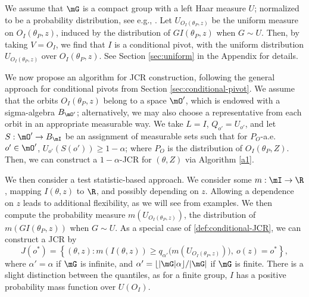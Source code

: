 \documentclass[english]{article}
\begin{document}
We assume that $\mG$ is a compact group with a left Haar measure $U$; normalized to be a probability distribution, see e.g., \cite{eaton1989group,wijsman1990invariant}. 
Let $U_{O_I(\theta_P,z)}$ be the uniform measure on $O_I(\theta_P,z)$, induced by the distribution of $GI(\theta_P,z)$ when $G\sim U$.
Then, by taking $V = O_I$, we find that $I$ is a conditional pivot, with the uniform distribution $U_{O_I(\theta_P,z)}$ over $O_I(\theta_P,z)$. See Section \ref{sec:uniform} in the Appendix for details.

  
We now propose an algorithm for JCR construction, following the general approach for conditional pivots from Section \ref{sec:conditional-pivot}. 
We assume that the orbits $O_I(\theta_P,z)$ 
belong to a space $\mO'$, which is endowed with a sigma-algebra $B_{\mO'}$; alternatively, we may also choose a representative from each orbit in an appropriate measurable way.
We take $L = I$, $Q_{o'} = U_{o'}$,
and let $S: \mO' \to B_{\mI}$ be an assignment of measurable sets such that for $P_O$-a.e. $o' \in \mO'$,  $U_{o'}(S(o'))\ge 1-\alpha$;
where $P_O$ is the distribution of $O_I(\theta_P,Z)$.
Then, we can 
 construct a  $1-\alpha$-JCR for $(\theta,Z)$ via Algorithm \ref{a1}.
 
We then consider a test statistic-based approach.
We consider some $m: \mI\to \R$, mapping $I(\theta,z)$ to $\R$, and possibly depending on $z$. 
Allowing a dependence on $z$ leads to additional flexibility, as we will see from examples.
We then compute
the probability measure $m(U_{O_I(\theta_P,z)})$, 
the distribution of $m(GI(\theta_P,z))$ when $G\sim U$.
As a special case of \eqref{def:conditional-JCR}, we can construct a JCR by 
\begin{equation*}\label{J1}
J(o^*)=\left\{(\theta, z): m(I(\theta, z)) \ge q_{\alpha'}
\bigg(  m(U_{O_I(\theta_P,z)}) \bigg),
\
o(z) = o^*\right\},
\end{equation*}
where $\alpha' = \alpha$ if $\mG$ is infinite, 
and $\alpha' = \lfloor |\mG|\alpha\rfloor/|\mG|$ if $\mG$ is finite. 
There is a slight distinction between the quantiles,
as for a finite group, $I$ has a positive probability  mass function over $U(O_I)$. 
\end{document}
